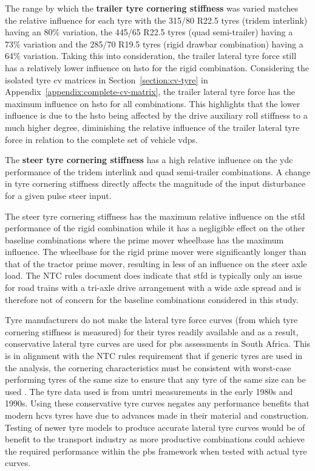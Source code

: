 The range by which the \textbf{trailer tyre cornering stiffness} was varied matches the relative influence for each tyre with the 315/80 R22.5 tyres (tridem interlink) having an 80\% variation, the 445/65 R22.5 tyres (quad semi-trailer) having a 73\% variation and the 285/70 R19.5 tyres (rigid drawbar combination) having a 64\% variation. Taking this into consideration, the trailer lateral tyre force still has a relatively lower influence on \gls{hsto} for the rigid combination. Considering the isolated tyre \gls{cv} matrices in Section~\ref{section:cv-tyre} in Appendix~\ref{appendix:complete-cv-matrix}, the trailer lateral tyre force has the maximum influence on \gls{hsto} for all combinations. This highlights that the lower influence is due to the \gls{hsto} being affected by the drive auxiliary roll stiffness to a much higher degree, diminishing the relative influence of the trailer lateral tyre force in relation to the complete set of vehicle \glspl{vdp}.

The \textbf{steer tyre cornering stiffness} has a high relative influence on the \gls{ydc} performance of the tridem interlink and quad semi-trailer combinations. A change in tyre cornering stiffness directly affects the magnitude of the input disturbance for a given pulse steer input.

The steer tyre cornering stiffness has the maximum relative influence on the \gls{stfd} performance of the rigid combination while it has a negligible effect on the other baseline combinations where the prime mover wheelbase has the maximum influence. The wheelbase for the rigid prime mover were significantly longer than that of the tractor prime mover, resulting in less of an influence on the steer axle load. The NTC rules document \cite{NationalTransportCommission2008} does indicate that \gls{stfd} is typically only an issue for road trains with a tri-axle drive arrangement with a wide axle spread and is therefore not of concern for the baseline combinations considered in this study.

Tyre manufacturers do not make the lateral tyre force curves (from which tyre cornering stiffness is measured) for their tyres readily available and as a result, conservative lateral tyre curves are used for \gls{pbs} assessments in South Africa. This is in alignment with the NTC rules requirement that if generic tyres are used in the analysis, the cornering characteristics must be consistent with worst-case performing tyres of the same size to ensure that any tyre of the same size can be used \cite{NationalTransportCommission2008}. The tyre data used is from \gls{umtri} \cite{Fancher1981, Bogard1991} measurements in the early 1980s and 1990s. Using these conservative tyre curves negates any performance benefits that modern \glspl{hcv} tyres have due to advances made in their material and construction. Testing of newer tyre models to produce accurate lateral tyre curves would be of benefit to the transport industry as more productive combinations could achieve the required performance within the \gls{pbs} framework when tested with actual tyre curves.


